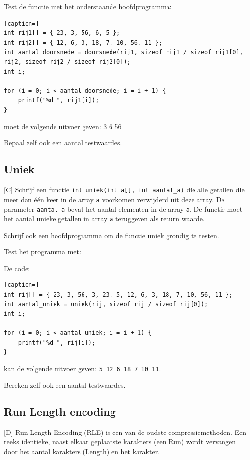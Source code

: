 \documentclass[a4paper,10pt,fleqn,twoside]{article}
\begin{document}

Test de functie met het onderstaande hoofdprogramma:

\begin{lstlisting}[caption=]
int rij1[] = { 23, 3, 56, 6, 5 };
int rij2[] = { 12, 6, 3, 18, 7, 10, 56, 11 }; 
int aantal_doorsnede = doorsnede(rij1, sizeof rij1 / sizeof rij1[0], rij2, sizeof rij2 / sizeof rij2[0]);
int i;

for (i = 0; i < aantal_doorsnede; i = i + 1) {
	printf("%d ", rij1[i]);
} 
\end{lstlisting}

moet de volgende uitvoer geven:
3 6 56

Bepaal zelf ook een aantal testwaardes.

\subsection{Uniek}[C]
Schrijf een functie \lstinline|int uniek(int a[], int aantal_a)| die alle getallen die meer dan één keer in de array \lstinline|a| voorkomen verwijderd uit deze array. De parameter \lstinline|aantal_a| bevat het aantal elementen in de array \lstinline|a|. De functie moet het aantal unieke getallen in array \lstinline|a| teruggeven als return waarde.

Schrijf ook een hoofdprogramma om de functie uniek grondig te testen.

Test het programma met:

De code:

\begin{lstlisting}[caption=]
int rij[] = { 23, 3, 56, 3, 23, 5, 12, 6, 3, 18, 7, 10, 56, 11 }; 
int aantal_uniek = uniek(rij, sizeof rij / sizeof rij[0]);
int i;

for (i = 0; i < aantal_uniek; i = i + 1) {
	printf("%d ", rij[i]);
} 
\end{lstlisting}

kan de volgende uitvoer geven:
\lstinline|5 12 6 18 7 10 11|.

Bereken zelf ook een aantal testwaardes.

\subsection{Run Length encoding}[D]
Run Length Encoding (RLE) is een van de oudste compressiemethoden. Een reeks identieke, naast elkaar geplaatste karakters (een Run) wordt vervangen door het aantal karakters (Length) en het karakter.
\end{document}
